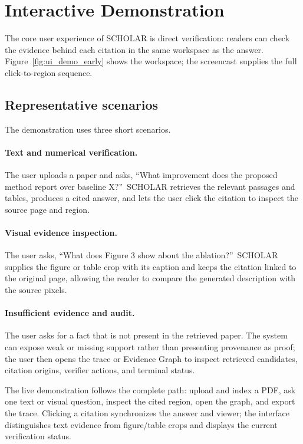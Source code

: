 \section{Interactive Demonstration}
\label{sec:demo}

The core user experience of \textsc{SCHOLAR} is direct verification: readers can check the evidence behind each citation in the same workspace as the answer. Figure~\ref{fig:ui_demo_early} shows the workspace; the screencast supplies the full click-to-region sequence.

\subsection{Representative scenarios}
The demonstration uses three short scenarios.

\paragraph{Text and numerical verification.}
The user uploads a paper and asks, \textquotedblleft What improvement does the proposed method report over baseline X?\textquotedblright\ SCHOLAR retrieves the relevant passages and tables, produces a cited answer, and lets the user click the citation to inspect the source page and region.

\paragraph{Visual evidence inspection.}
The user asks, \textquotedblleft What does Figure 3 show about the ablation?\textquotedblright\ SCHOLAR supplies the figure or table crop with its caption and keeps the citation linked to the original page, allowing the reader to compare the generated description with the source pixels.

\paragraph{Insufficient evidence and audit.}
The user asks for a fact that is not present in the retrieved paper. The system can expose weak or missing support rather than presenting provenance as proof; the user then opens the trace or Evidence Graph to inspect retrieved candidates, citation origins, verifier actions, and terminal status.

The live demonstration follows the complete path: upload and index a PDF, ask one text or visual question, inspect the cited region, open the graph, and export the trace. Clicking a citation synchronizes the answer and viewer; the interface distinguishes text evidence from figure/table crops and displays the current verification status.

